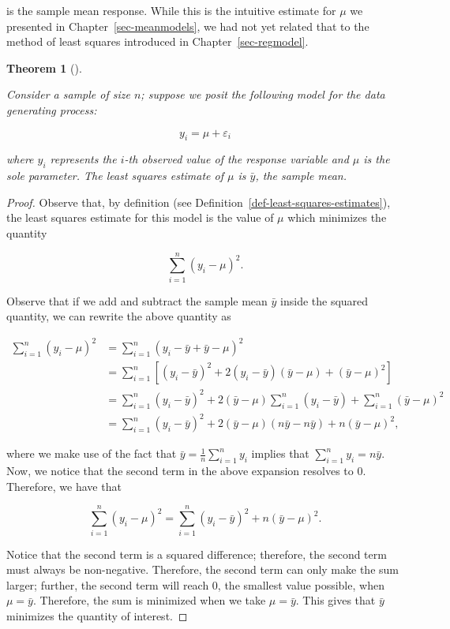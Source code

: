 \documentclass[
  letterpaper,
  DIV=11,
  numbers=noendperiod]{scrreprt}
\theoremstyle{definition}
\theoremstyle{definition}
\theoremstyle{plain}
\newtheorem{theorem}{Theorem}[chapter]
\theoremstyle{remark}
\begin{document}
is the sample mean response. While this is the intuitive estimate for
\(\mu\) we presented in Chapter~\ref{sec-meanmodels}, we had not yet
related that to the method of least squares introduced in
Chapter~\ref{sec-regmodel}.

\begin{theorem}[]\protect\hypertarget{thm-app-teststat-ls-one}{}\label{thm-app-teststat-ls-one}

Consider a sample of size \(n\); suppose we posit the following model
for the data generating process:

\[y_i = \mu + \varepsilon_i\]

where \(y_i\) represents the \(i\)-th observed value of the response
variable and \(\mu\) is the sole parameter. The least squares estimate
of \(\mu\) is \(\bar{y}\), the sample mean.

\end{theorem}

\begin{proof}

Observe that, by definition (see
Definition~\ref{def-least-squares-estimates}), the least squares
estimate for this model is the value of \(\mu\) which minimizes the
quantity

\[\sum_{i=1}^{n} \left(y_i - \mu\right)^2.\]

Observe that if we add and subtract the sample mean \(\bar{y}\) inside
the squared quantity, we can rewrite the above quantity as

\[
\begin{aligned}
  \sum_{i=1}^{n} \left(y_i - \mu\right)^2 
    &= \sum_{i=1}^{n} \left(y_i - \bar{y} + \bar{y} - \mu\right)^2 \\
    &= \sum_{i=1}^{n} \left[\left(y_i - \bar{y}\right)^2 + 2\left(y_i - \bar{y}\right)\left(\bar{y} - \mu\right) + \left(\bar{y} - \mu\right)^2\right] \\
    &= \sum_{i=1}^{n} \left(y_i - \bar{y}\right)^2 + 2\left(\bar{y} - \mu\right) \sum_{i=1}^{n}\left(y_i - \bar{y}\right) + \sum_{i=1}^{n}\left(\bar{y} - \mu\right)^2 \\
    &= \sum_{i=1}^{n} \left(y_i - \bar{y}\right)^2 + 2\left(\bar{y} - \mu\right) \left(n\bar{y} - n\bar{y}\right) + n\left(\bar{y} - \mu\right)^2, 
\end{aligned}
\]

where we make use of the fact that
\(\bar{y} = \frac{1}{n}\sum_{i=1}^{n} y_i\) implies that
\(\sum_{i=1}^{n} y_i = n\bar{y}\). Now, we notice that the second term
in the above expansion resolves to 0. Therefore, we have that

\[\sum_{i=1}^{n} \left(y_i - \mu\right)^2 = \sum_{i=1}^{n} \left(y_i - \bar{y}\right)^2 + n\left(\bar{y} - \mu\right)^2.\]

Notice that the second term is a squared difference; therefore, the
second term must always be non-negative. Therefore, the second term can
only make the sum larger; further, the second term will reach 0, the
smallest value possible, when \(\mu = \bar{y}\). Therefore, the sum is
minimized when we take \(\mu = \bar{y}\). This gives that \(\bar{y}\)
minimizes the quantity of interest.

\end{proof}
\end{document}

